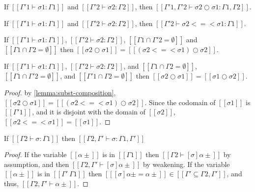 \begin{lemma}
  If $[[Γ'1 ⊢ σ1 : Γ1]]$ and $[[Γ'2 ⊢ σ2 : Γ2]]$,
  then $[[Γ'1, Γ'2 ⊢ σ2 ○ σ1 : Γ1, Γ2]]$.
\end{lemma}

\begin{lemma}
  \label{lemma:subst-monad-composition-wf}
  If $[[Γ'1 ⊢ σ1 : Γ1]]$ and $[[Γ'2 ⊢ σ2 : Γ2]]$,
  then $[[Γ'2 ⊢ σ2 <=< σ1 : Γ1]]$.
\end{lemma}

\begin{lemma}
  \label{lemma:subst-composition}
    If $[[Γ'1 ⊢ σ1 : Γ1]]$, $[[Γ'2 ⊢ σ2 : Γ2]]$, 
    $[[Γ1 ∩ Γ'2 = ∅ ]]$ and $[[ Γ1 ∩ Γ2 = ∅ ]]$ then 
    $[[ σ2 ○ σ1 ]] = [[ (σ2 <=< σ1) ○ σ2 ]]$.
\end{lemma}

\begin{corollary}
  \label{corollary:subst-composition-commutativity}
  If $[[Γ'1 ⊢ σ1 : Γ1]]$, $[[Γ'2 ⊢ σ2 : Γ2]]$, and
  $[[ Γ1 ∩ Γ2 = ∅ ]]$, 
  $[[ Γ1 ∩ Γ'2 = ∅ ]]$, and
  $[[ Γ'1 ∩ Γ2 = ∅ ]]$ then 
  $[[ σ2 ○ σ1 ]] = [[ σ1 ○ σ2 ]]$.
\end{corollary}
\begin{proof}
  by \cref{lemma:subst-composition},
    $[[ σ2 ○ σ1 ]] = [[ (σ2 <=< σ1) ○ σ2 ]]$.
    Since the codomain of $[[σ1]]$ is $[[Γ'1]]$,
    and it is disjoint with the domain of $[[σ2]]$,
    $[[σ2 <=< σ1]] = [[σ1]]$.
\end{proof}

\begin{lemma}
  \label{lemma:subst-domain-weakening}
  If $[[Γ2 ⊢ σ : Γ1]]$ then $[[Γ2, Γ' ⊢ σ : Γ1, Γ']]$
\end{lemma}
\begin{proof}
  If the variable $[[α±]]$ is in $[[Γ1]]$ then $[[Γ2 ⊢ [σ]α± ]]$ by assumption,
  and then $[[Γ2, Γ' ⊢ [σ]α± ]]$ by weakening.
  If the variable $[[α±]]$ is in $[[Γ' \ Γ1]]$ then $[[ [σ]α± = α± ]] \in [[Γ' ⊆ Γ2, Γ']]$, 
  and thus, $[[Γ2, Γ' ⊢ α± ]]$.
\end{proof}

